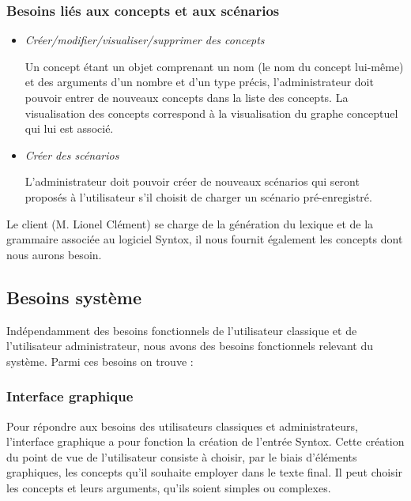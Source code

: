 \documentclass[12pt]{report}
\begin{document}
\subsubsection{Besoins liés aux concepts et aux scénarios}

\begin{itemize}
\item \emph{Créer/modifier/visualiser/supprimer des concepts}

	Un concept étant un objet comprenant un nom (le nom du concept lui-même) et des arguments d'un nombre et d'un type précis, l'administrateur doit pouvoir entrer de nouveaux concepts dans la liste des concepts.
	La visualisation des concepts correspond à la visualisation du graphe conceptuel qui lui est associé.
	
\item \emph{Créer des scénarios}

	L'administrateur doit pouvoir créer de nouveaux scénarios qui seront proposés à l'utilisateur s'il choisit de charger un scénario pré-enregistré.
	
\end{itemize}

Le client (M. Lionel Clément) se charge de la génération du lexique et de la grammaire associée au logiciel Syntox, il nous fournit également les concepts dont nous aurons besoin.

\subsection{Besoins système}

Indépendamment des besoins fonctionnels de l'utilisateur classique et de l'utilisateur administrateur, nous avons des besoins fonctionnels relevant du système. Parmi ces besoins on trouve :

\subsubsection{Interface graphique}

Pour répondre aux besoins des utilisateurs classiques et administrateurs, l'interface graphique a pour fonction la création de l'entrée Syntox. Cette création du point de vue de l'utilisateur consiste à choisir, par le biais d'éléments graphiques, les concepts qu'il souhaite employer dans le texte final. Il peut choisir les concepts et leurs arguments, qu'ils soient simples ou complexes.

\bigskip
\end{document}
